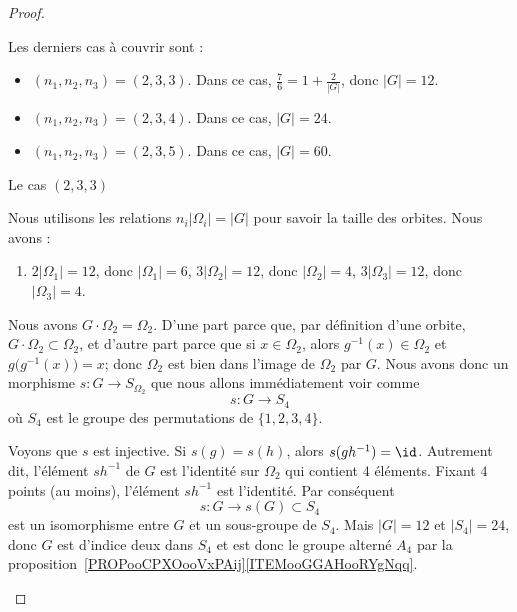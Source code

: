 \begin{proof}
\begin{subproof}
                Les derniers cas à couvrir sont :
                \begin{itemize}
                    \item \( (n_1,n_2,n_3)=(2,3,3)\). Dans ce cas, \( \frac{ 7 }{ 6 }=1+\frac{ 2 }{ | G | }\), donc \( | G |=12\).
                    \item \( (n_1,n_2,n_3)=(2,3,4)\). Dans ce cas, \( | G |=24\).
                    \item \( (n_1,n_2,n_3)=(2,3,5)\). Dans ce cas, \( | G |=60\).
                \end{itemize}

            \item[Le cas \( (2,3,3)\)]

                Nous utilisons les relations \( n_i| \Omega_i |=| G |\) pour savoir la taille des orbites. Nous avons :
                \begin{enumerate}
                    \item
                        \( 2| \Omega_1 |=12\), donc \( | \Omega_1 |=6\),
                        \( 3| \Omega_2 |=12\), donc \( | \Omega_2 |=4\),
                        \( 3| \Omega_3 |=12\), donc \( | \Omega_3 |=4\).
                \end{enumerate}

                Nous avons \( G\cdot \Omega_2=\Omega_2\). D'une part parce que, par définition d'une orbite, \( G\cdot\Omega_2\subset\Omega_2\), et d'autre part parce que si \( x\in\Omega_2\), alors \( g^{-1}(x)\in\Omega_2\) et \( g\big( g^{-1}(x) \big)=x\); donc \( \Omega_2\) est bien dans l'image de \( \Omega_2\) par \( G\). Nous avons donc un morphisme \( s\colon G\to S_{\Omega_2}\) que nous allons immédiatement voir comme
                \begin{equation}
                    s\colon G\to S_4
                \end{equation}
                où \( S_4\) est le groupe des permutations de \( \{ 1,2,3,4 \}\).

                Voyons que \( s\) est injective. Si \( s(g)=s(h)\), alors \( s(gh^{-1})=\id\). Autrement dit, l'élément \( sh^{-1}\) de \( G\) est l'identité sur \( \Omega_2\) qui contient \( 4\) éléments. Fixant \( 4\) points (au moins), l'élément \( sh^{-1}\) est l'identité. Par conséquent
                \begin{equation}
                    s\colon G\to s(G)\subset S_4
                \end{equation}
                est un isomorphisme entre \( G\) et un sous-groupe de \( S_4\). Mais \( | G |=12\) et \( | S_4 |=24\), donc \( G\) est d'indice deux dans \( S_4\) et est donc le groupe alterné \( A_4\) par la proposition~\ref{PROPooCPXOooVxPAij}\ref{ITEMooGGAHooRYgNqq}.


\end{subproof}
\end{proof}
